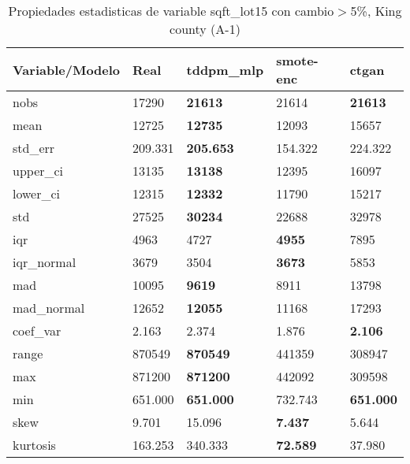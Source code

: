 \begin{table}[H]
\centering
\fontsize{8}{14}\selectfont
\caption{Propiedades estadisticas de variable sqft\_lot15 con cambio\ensuremath{>}5\%, King county (A-1)}
\label{table-stats-king county-a-1-sqft_lot15-short}
\begin{tabular}{|l|m{10em}|m{10em}|m{10em}|m{10em}|}
\hline
 \rowcolor[gray]{0.8}
Variable/Modelo & Real & tddpm\_mlp & smote-enc & ctgan \\
\hline nobs & 17290 & \bfseries 21613 & \cellcolor[rgb]{0.9, 0.54, 0.52} 21614 & \bfseries 21613 \\
\hline mean & 12725 & \bfseries 12735 & 12093 & \cellcolor[rgb]{0.9, 0.54, 0.52} 15657 \\
\hline std\_err & 209.331 & \bfseries 205.653 & \cellcolor[rgb]{0.9, 0.54, 0.52} 154.322 & 224.322 \\
\hline upper\_ci & 13135 & \bfseries 13138 & 12395 & \cellcolor[rgb]{0.9, 0.54, 0.52} 16097 \\
\hline lower\_ci & 12315 & \bfseries 12332 & 11790 & \cellcolor[rgb]{0.9, 0.54, 0.52} 15217 \\
\hline std & 27525 & \bfseries 30234 & 22688 & \cellcolor[rgb]{0.9, 0.54, 0.52} 32978 \\
\hline iqr & 4963 & 4727 & \bfseries 4955 & \cellcolor[rgb]{0.9, 0.54, 0.52} 7895 \\
\hline iqr\_normal & 3679 & 3504 & \bfseries 3673 & \cellcolor[rgb]{0.9, 0.54, 0.52} 5853 \\
\hline mad & 10095 & \bfseries 9619 & 8911 & \cellcolor[rgb]{0.9, 0.54, 0.52} 13798 \\
\hline mad\_normal & 12652 & \bfseries 12055 & 11168 & \cellcolor[rgb]{0.9, 0.54, 0.52} 17293 \\
\hline coef\_var & 2.163 & 2.374 & \cellcolor[rgb]{0.9, 0.54, 0.52} 1.876 & \bfseries 2.106 \\
\hline range & 870549 & \bfseries 870549 & 441359 & \cellcolor[rgb]{0.9, 0.54, 0.52} 308947 \\
\hline max & 871200 & \bfseries 871200 & 442092 & \cellcolor[rgb]{0.9, 0.54, 0.52} 309598 \\
\hline min & 651.000 & \bfseries 651.000 & \cellcolor[rgb]{0.9, 0.54, 0.52} 732.743 & \bfseries 651.000 \\
\hline skew & 9.701 & \cellcolor[rgb]{0.9, 0.54, 0.52} 15.096 & \bfseries 7.437 & 5.644 \\
\hline kurtosis & 163.253 & \cellcolor[rgb]{0.9, 0.54, 0.52} 340.333 & \bfseries 72.589 & 37.980 \\

\end{tabular}
\end{table}
